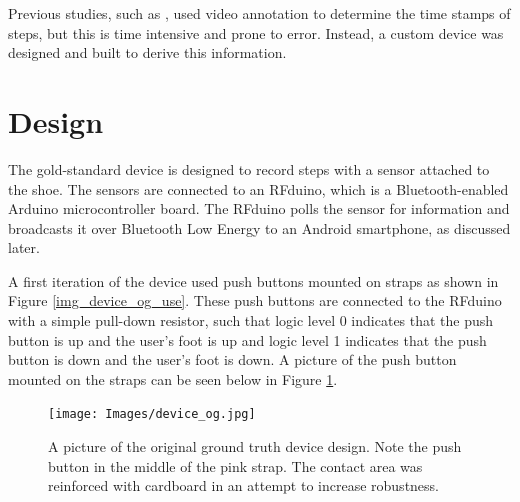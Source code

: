         Previous studies, such as \cite{brajdic}, used video annotation to determine the time stamps of steps, but this is time intensive and prone to error. Instead, a custom device was designed and built to derive this information.

        \section{Design}

            The gold-standard device is designed to record steps with a sensor attached to the shoe. The sensors are connected to an RFduino, which is a Bluetooth-enabled Arduino microcontroller board. The RFduino polls the sensor for information and broadcasts it over Bluetooth Low Energy to an Android smartphone, as discussed later. 

            A first iteration of the device used push buttons mounted on straps as shown in Figure \ref{img_device_og_use}. These push buttons are connected to the RFduino with a simple pull-down resistor, such that logic level 0 indicates that the push button is up and the user's foot is up and logic level 1 indicates that the push button is down and the user's foot is down. A picture of the push button mounted on the straps can be seen below in Figure \ref{img_device_og}.

            \begin{figure}[!th]
                \texttt{[image: Images/device\_og.jpg]}
                \centering
                \caption{A picture of the original ground truth device design. Note the push button in the middle of the pink strap. The contact area was reinforced with cardboard in an attempt to increase robustness.}
                \label{img_device_og}
            \end{figure}

